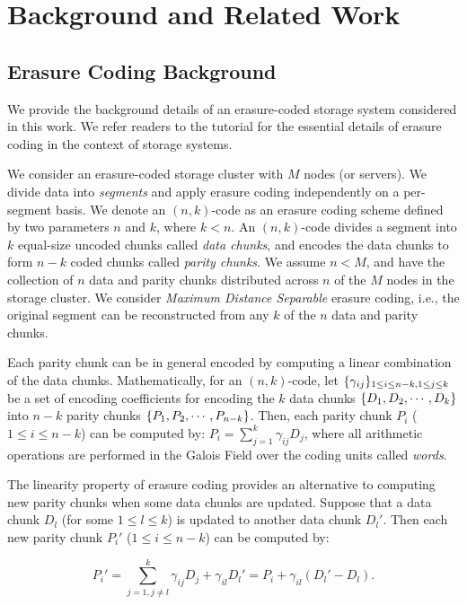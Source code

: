 \chapter{Background and Related Work}
\label{sec:background}

\section{Erasure Coding Background}

We provide the background details of an erasure-coded storage system
considered in this work. We refer readers to the tutorial \cite{plank13} 
for the essential details of erasure coding in the context of storage systems. 

We consider an erasure-coded storage cluster with $M$ nodes (or servers).  We
divide data into {\em segments} and apply erasure coding independently on a
per-segment basis.  We denote an $(n,k)$-code as an erasure coding scheme
defined by two parameters $n$ and $k$, where $k<n$.  An $(n,k)$-code divides a
segment into $k$ equal-size uncoded chunks called {\em data chunks}, and
encodes the data chunks to form $n-k$ coded chunks called {\em parity chunks}.
We assume $n < M$, and have the collection of $n$ data and parity chunks
distributed across $n$ of the $M$ nodes in the storage cluster.  We consider
{\em Maximum Distance Separable} erasure coding, i.e., the original segment
can be reconstructed from any $k$ of the $n$ data and parity chunks. 

Each parity chunk can be in general encoded by computing a linear combination
of the data chunks.  Mathematically, for an $(n,k)$-code, let
$\lbrace \gamma_{ij} \rbrace_{1\le i\le n-k, 1\le j\le k}$ be a set of encoding
coefficients for encoding the $k$ data chunks $\lbrace D_1, D_2,\cdots,D_k \rbrace$ into
$n-k$ parity chunks $\lbrace P_1,P_2,\cdots,P_{n-k} \rbrace$.  Then, each parity chunk
$P_i$ ($1\le i\le n-k$) can be computed by:
$P_i = \sum_{j=1}^{k} \gamma_{ij} D_j$, 
where all arithmetic operations are performed in the Galois Field over the
coding units called {\em words}. 

The linearity property of erasure coding provides an alternative to computing
new parity chunks when some data chunks are updated.  Suppose that a data
chunk $D_l$ (for some $1\le l\le k$) is updated to another data chunk $D_l'$. 
Then each new parity chunk $P_i'$ ($1\le i\le n-k$) can be computed by:

\begin{equation*}
P_i' = \sum_{j=1,j\ne l}^{k} \gamma_{ij} D_j + \gamma_{il} D_l' 
= P_i + \gamma_{il}(D_l' - D_l). 
\end{equation*}

